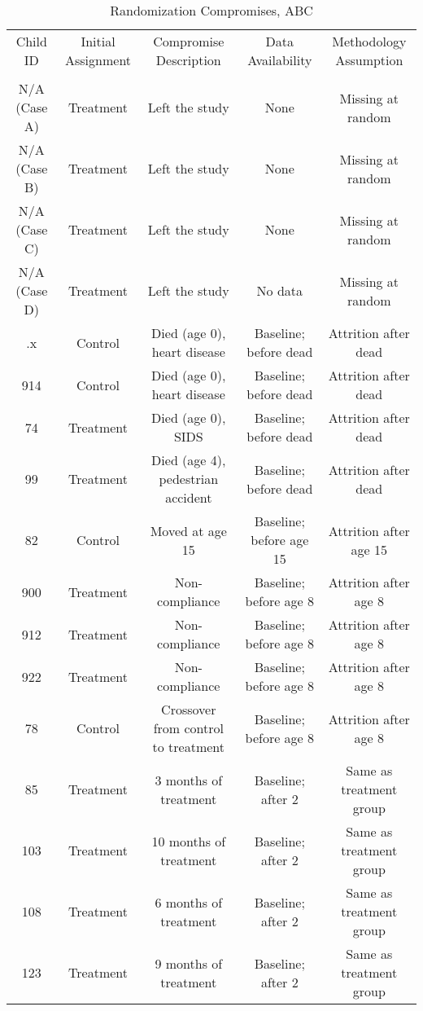 \begin{sidewaystable}[H] 
\begin{threeparttable}
\caption{Randomization Compromises, ABC}
\label{table:abccompromises}
\centering
\footnotesize
\begin{tabular}{ccccc} \toprule
Child ID & Initial Assignment & Compromise Description & Data Availability & Methodology Assumption \\ \\ \midrule
N/A (Case A) & Treatment & Left the study & None & Missing at random \\
N/A (Case B) & Treatment & Left the study & None & Missing at random \\
N/A (Case C) & Treatment & Left the study & None & Missing at random \\
N/A (Case D) & Treatment & Left the study & No data & Missing at random \\ \midrule
.x    & Control  & Died (age 0), heart disease & Baseline; before dead & Attrition after dead \\
914 & Control  & Died (age 0), heart disease & Baseline; before dead & Attrition after dead \\
74 & Treatment & Died (age 0), SIDS & Baseline; before dead & Attrition after dead \\
99 & Treatment  & Died (age 4), pedestrian accident & Baseline; before dead & Attrition after dead \\ \midrule
82 & Control       & Moved at age 15 &   Baseline; before age 15 & Attrition after age 15 \\ \midrule
900 & Treatment  & Non-compliance  & Baseline; before age 8 & Attrition after age 8  \\
912 & Treatment  & Non-compliance  & Baseline; before age 8 & Attrition after age 8  \\
922 & Treatment  & Non-compliance  & Baseline; before age 8 & Attrition after age 8  \\ \midrule
78  & Control        & Crossover from control to treatment & Baseline; before age 8 & Attrition after age 8  \\ \midrule
85 & Treatment   & 3 months of treatment &  Baseline; after 2 & Same as treatment group  \\  
103 & Treatment &10 months of treatment &  Baseline; after 2 & Same as treatment group  \\
108 & Treatment & 6 months of treatment &  Baseline; after 2 & Same as treatment group  \\ 
123 & Treatment & 9 months of treatment &  Baseline; after 2 & Same as treatment group  \\  \midrule

\end{tabular}
\end{threeparttable}
\end{sidewaystable}
